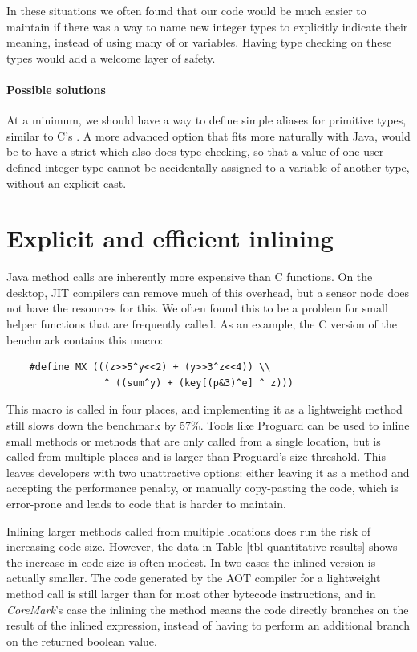 In these situations we often found that our code would be much easier to maintain if there was a way to name new integer types to explicitly indicate their meaning, instead of using many of  or  variables. Having type checking on these types would add a welcome layer of safety.

\paragraph{Possible solutions}
At a minimum, we should have a way to define simple aliases for primitive types, similar to C's . A more advanced option that fits more naturally with Java, would be to have a strict  which also does type checking, so that a value of one user defined integer type cannot be accidentally assigned to a variable of another type, without an explicit cast.




\section{Explicit and efficient inlining}
\label{sec-inlining}
Java method calls are inherently more expensive than C functions. On the desktop, JIT compilers can remove much of this overhead, but a sensor node does not have the resources for this. We often found this to be a problem for small helper functions that are frequently called. As an example, the C version of the  benchmark contains this macro: 

\begin{verbatim}
    #define MX (((z>>5^y<<2) + (y>>3^z<<4)) \\
                 ^ ((sum^y) + (key[(p&3)^e] ^ z)))
\end{verbatim}

This macro is called in four places, and implementing it as a lightweight method still slows down the benchmark by 57\%. Tools like Proguard \cite{proguard} can be used to inline small methods or methods that are only called from a single location, but  is called from multiple places and is larger than Proguard's size threshold. This leaves developers with two unattractive options: either leaving it as a method and accepting the performance penalty, or manually copy-pasting the code, which is error-prone and leads to code that is harder to maintain.

Inlining larger methods called from multiple locations does run the risk of increasing code size. However, the data in Table \ref{tbl-quantitative-results} shows the increase in code size is often modest. In two cases the inlined version is actually smaller. The code generated by the AOT compiler for a lightweight method call is still larger than for most other bytecode instructions, and in \emph{CoreMark}'s case the inlining the  method means the code directly branches on the result of the inlined expression, instead of having to perform an additional branch on the returned boolean value.

